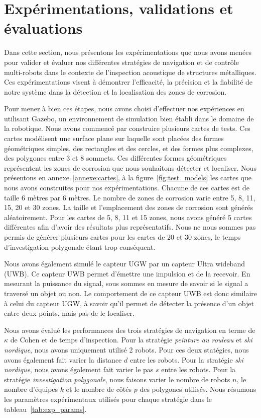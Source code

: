 \documentclass[francais,RandD]{rapportPFE}
\begin{document}
	\section{Expérimentations, validations et évaluations}
		Dans cette section, nous présentons les expérimentations que nous avons menées pour valider et évaluer nos différentes stratégies de navigation et de contrôle multi-robots dans le contexte de l'inspection acoustique de structures métalliques.
		Ces expérimentations visent à démontrer l'efficacité, la précision et la fiabilité de notre système dans la détection et la localisation des zones de corrosion.

		Pour mener à bien ces étapes, nous avons choisi d'effectuer nos expériences en utilisant Gazebo, un environnement de simulation bien établi dans le domaine de la robotique.
		Nous avons commencé par construire plusieurs cartes de tests.
		Ces cartes modélisent une surface plane sur laquelle sont placées des formes géométriques simples, des rectangles et des cercles, et des formes plus complexes, des polygones entre 3 et 8 sommets.
		Ces différentes formes géométriques représentent les zones de corrosion que nous souhaitons détecter et localiser.
		Nous présentons en annexe~\ref{annexe:cartes}, à la figure~\ref{fig:test_models} les cartes que nous avons construites pour nos expérimentations.
		Chacune de ces cartes est de taille 6 mètres par 6 mètres.
		Le nombre de zones de corrosion varie entre 5, 8, 11, 15, 20 et 30 zones.
		La taille et l'emplacement des zones de corrosion sont générés aléatoirement.
		Pour les cartes de 5, 8, 11 et 15 zones, nous avons généré 5 cartes différentes afin d'avoir des résultats plus représentatifs.
		Nous ne nous sommes pas permis de générer plusieurs cartes pour les cartes de 20 et 30 zones, le temps d'investigation polygonale étant trop conséquent.

		Nous avons également simulé le capteur UGW par un capteur Ultra wideband (UWB).
		Ce capteur UWB permet d'émettre une impulsion et de la recevoir.
		En mesurant la puissance du signal, sous sommes en mesure de savoir si le signal a traversé un objet ou non.
		Le comportement de ce capteur UWB est donc similaire à celui du capteur UGW, à savoir qu'il permet de détecter la présence d'un objet entre deux points, mais pas de le localiser.

		Nous avons évalué les performances des trois stratégies de navigation en terme de $\kappa$ de Cohen et de temps d'inspection.
		Pour la stratégie \textit{peinture au rouleau} et \textit{ski nordique}, nous avons uniquement utilisé 2 robots.
		Pour ces deux statégies, nous avons également fait varier la distance $d$ entre les robots.
		Pour la stratégie \textit{ski nordique}, nous avons également fait varier le pas $s$ entre les robots.
		Pour la stratégie \textit{investigation polygonale}, nous faisons varier le nombre de robots $n$, le nombre d'équipes $k$ et le nombre de côtés $p$ des polygones utilisés.
		Nous résumons les paramètres expérimentaux utilisés pour chaque stratégie dans le tableau~\ref{tab:exp_params}.
\end{document}
